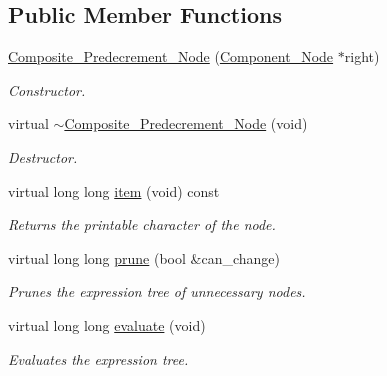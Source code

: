 \subsection*{Public Member Functions}
\begin{DoxyCompactItemize}
\item 
\hyperlink{classMadara_1_1Expression__Tree_1_1Composite__Predecrement__Node_a33acd37f72b3f52afc0956319f91192d}{Composite\_\-Predecrement\_\-Node} (\hyperlink{classMadara_1_1Expression__Tree_1_1Component__Node}{Component\_\-Node} $\ast$right)
\begin{DoxyCompactList}\small\item\em Constructor. \item\end{DoxyCompactList}\item 
virtual \hyperlink{classMadara_1_1Expression__Tree_1_1Composite__Predecrement__Node_a4997046c02c572f8e066e316bc670842}{$\sim$Composite\_\-Predecrement\_\-Node} (void)
\begin{DoxyCompactList}\small\item\em Destructor. \item\end{DoxyCompactList}\item 
virtual long long \hyperlink{classMadara_1_1Expression__Tree_1_1Composite__Predecrement__Node_a951a934559c2ee7f2aa6a3ff00b0c14d}{item} (void) const 
\begin{DoxyCompactList}\small\item\em Returns the printable character of the node. \item\end{DoxyCompactList}\item 
virtual long long \hyperlink{classMadara_1_1Expression__Tree_1_1Composite__Predecrement__Node_a68dc02a74f35832dadbd66c7a15110c0}{prune} (bool \&can\_\-change)
\begin{DoxyCompactList}\small\item\em Prunes the expression tree of unnecessary nodes. \item\end{DoxyCompactList}\item 
virtual long long \hyperlink{classMadara_1_1Expression__Tree_1_1Composite__Predecrement__Node_a98eaae3652e6a950960f51326bbe0040}{evaluate} (void)
\begin{DoxyCompactList}\small\item\em Evaluates the expression tree. \item\end{DoxyCompactList}\item 

\end{DoxyCompactItemize}
